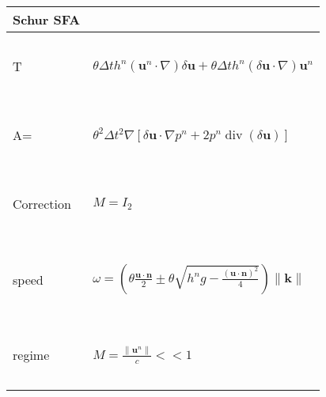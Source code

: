 \documentclass[a4paper, 11pt]{article}
\begin{document}
\begin{table}
\begin{tabular}{|l|l|}
  \hline
  Schur SFA &  \\
  \hline
  ~ & ~\\
  T &  $\theta\Delta th^n\left(\boldsymbol{u}^n\cdot\nabla\right)\delta \boldsymbol{u}+\theta\Delta th^n\left(\delta \boldsymbol{u} \cdot\nabla\right)\boldsymbol{u}^n$ \\ 
  ~ & ~\\
    \hline
   ~& ~\\ 
  A= & $\theta^2 \Delta t^2 \nabla\left[ \delta \boldsymbol{u}\cdot \nabla p^n + 2p^n \operatorname{div}(\delta \boldsymbol{u}) \right] $\\
  ~ & ~\\
      \hline
     ~ &~ \\
   Correction &  $M=I_2$ \\ 
   ~ & ~\\
    \hline
     ~ &~ \\
  speed & $\omega =\left(\theta\frac{\boldsymbol{u}\cdot \boldsymbol{n}}{2}\pm\theta\sqrt{h^ng-\frac{(\boldsymbol{u}\cdot \boldsymbol{n})^2}{4}}\right) \parallel \boldsymbol{k} \parallel$ \\ 
   ~ & ~\\
    \hline
    ~& ~\\
  regime & $M= \frac{\parallel \boldsymbol{u}^n \parallel }{c}<< 1$\\
   ~& ~\\
    \hline
\end{tabular}
\end{table}
\end{document}
